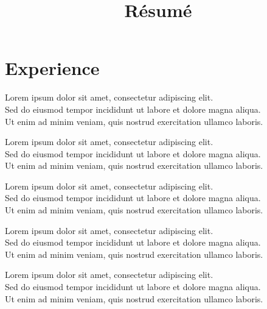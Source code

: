 \documentclass[11pt, a4paper, sans]{moderncv} %
\title{R\'esum\'e}
\begin{document}
\makecvtitle %




\section{Experience}

{
Lorem ipsum dolor sit amet, consectetur adipiscing elit. \\
Sed do eiusmod tempor incididunt ut labore et dolore magna aliqua. \\
Ut enim ad minim veniam, quis nostrud exercitation ullamco laboris.
}

{
Lorem ipsum dolor sit amet, consectetur adipiscing elit. \\
Sed do eiusmod tempor incididunt ut labore et dolore magna aliqua. \\
Ut enim ad minim veniam, quis nostrud exercitation ullamco laboris.
}

{
Lorem ipsum dolor sit amet, consectetur adipiscing elit. \\
Sed do eiusmod tempor incididunt ut labore et dolore magna aliqua. \\
Ut enim ad minim veniam, quis nostrud exercitation ullamco laboris.
}

{
Lorem ipsum dolor sit amet, consectetur adipiscing elit. \\
Sed do eiusmod tempor incididunt ut labore et dolore magna aliqua. \\
Ut enim ad minim veniam, quis nostrud exercitation ullamco laboris.
}

{
Lorem ipsum dolor sit amet, consectetur adipiscing elit. \\
Sed do eiusmod tempor incididunt ut labore et dolore magna aliqua. \\
Ut enim ad minim veniam, quis nostrud exercitation ullamco laboris.
}
\end{document}
